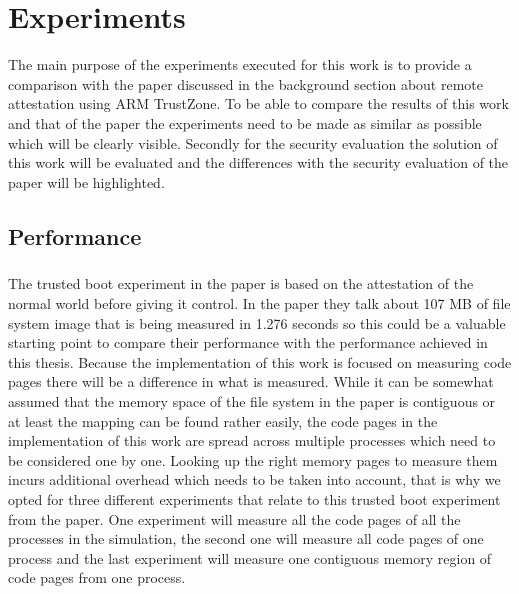 \chapter{Experiments}

The main purpose of the experiments executed for this work is to provide a comparison with the paper \cite{LingZhen2021Sbtb} discussed in the background section about remote attestation using ARM TrustZone. To be able to compare the results of this work and that of the paper the experiments need to be made as similar as possible which will be clearly visible. Secondly for the security evaluation the solution of this work will be evaluated and the differences with the security evaluation of the paper will be highlighted.

\section{Performance}

\paragraph*{}%
The trusted boot experiment in the paper is based on the attestation of the normal world before giving it control. In the paper they talk about 107 MB of file system image that is being measured in 1.276 seconds so this could be a valuable starting point to compare their performance with the performance achieved in this thesis. Because the implementation of this work is focused on measuring code pages there will be a difference in what is measured. While it can be somewhat assumed that the memory space of the file system in the paper is contiguous or at least the mapping can be found rather easily, the code pages in the implementation of this work are spread across multiple processes which need to be considered one by one. Looking up the right memory pages to measure them incurs additional overhead which needs to be taken into account, that is why we opted for three different experiments that relate to this trusted boot experiment from the paper. One experiment will measure all the code pages of all the processes in the simulation, the second one will measure all code pages of one process and the last experiment will measure one contiguous memory region of code pages from one process.

